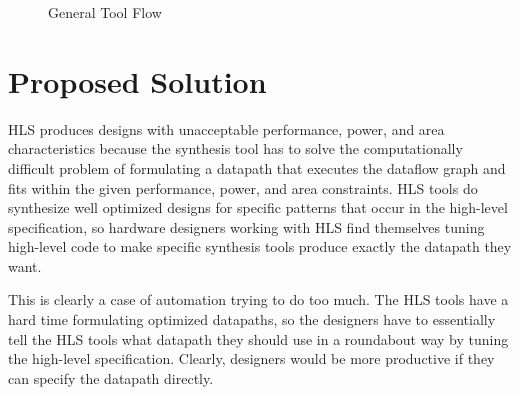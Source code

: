 \begin{figure}
	\centering
    \caption{General Tool Flow}
	\label{fig:workflow}
\end{figure}

\section{Proposed Solution}
HLS produces designs with unacceptable performance, power, and area characteristics because the synthesis tool has to solve the computationally difficult problem of formulating a datapath that executes the dataflow graph and fits within the given performance, power, and area constraints. HLS tools do synthesize well optimized designs for specific patterns that occur in the high-level specification, so hardware designers working with HLS find themselves tuning high-level code to make specific synthesis tools produce exactly the datapath they want. 

This is clearly a case of automation trying to do too much. The HLS tools have a hard time formulating optimized datapaths, so the designers have to essentially tell the HLS tools what datapath they should use in a roundabout way by tuning the high-level specification. Clearly, designers would be more productive if they can specify the datapath directly. 

